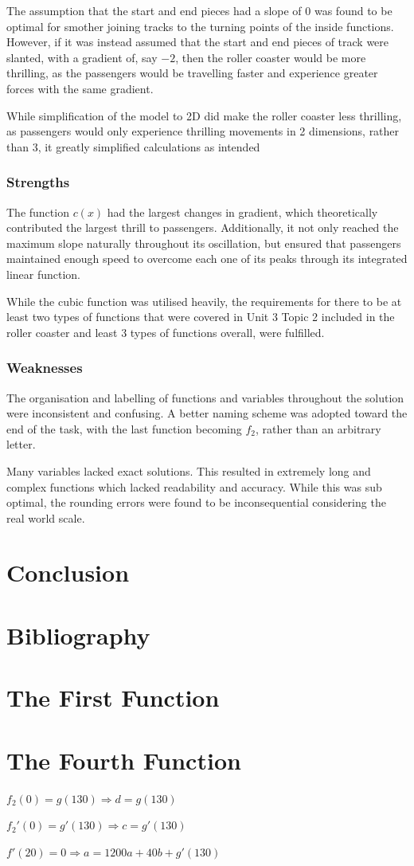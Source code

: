 \documentclass[11pt, letterpaper]{article}
\begin{document}
The assumption that the start and end pieces had a slope of 0 was found to be optimal for smother joining tracks to the  turning points of the inside functions. However, if it was instead assumed that the start and end pieces of track were slanted, with a gradient of, say $-2$, then the roller coaster would be more thrilling, as the passengers would be travelling faster and experience greater forces with the same gradient. 


While simplification of the model to 2D did make the roller coaster less thrilling, as passengers would only experience thrilling movements in 2 dimensions, rather than 3, it greatly simplified calculations as intended


\subsubsection{Strengths}


The function $c(x)$ had the largest changes in gradient, which theoretically contributed the largest thrill to passengers. Additionally, it not only reached the maximum slope naturally throughout its oscillation, but ensured that passengers maintained enough speed to overcome each one of its peaks through its integrated linear function.

While the cubic function was utilised heavily, the requirements for there to be at least two types of functions that were covered in Unit 3 Topic 2 included in the roller coaster and least 3 types of functions overall, were fulfilled.

\subsubsection{Weaknesses}


The organisation and labelling of functions and variables throughout the solution were inconsistent and confusing. A better naming scheme was adopted toward the end of the task, with the last function becoming $f_2$, rather than an arbitrary letter. 

Many variables lacked exact solutions. This resulted in extremely long and complex functions which lacked readability and accuracy. While this was sub optimal, the rounding errors were found to be inconsequential considering the real world scale.


\section{Conclusion}


\section {Bibliography}
\begin{appendices}
	\section{The First Function}
	
	
	\section{The Fourth Function}
	$f_2(0)=g(130)\Rightarrow d=g(130)$
	
	$f_2'(0) = g'(130)\Rightarrow c=g'(130)$
	
	$f'(20)=0\Rightarrow a=1200a+40b+g'(130)$
	
	
\end{appendices}
\end{document}
